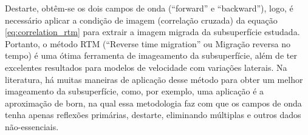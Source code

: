  Destarte, obtêm-se os dois campos de onda (``forward'' e ``backward''), logo, é necessário aplicar a condição de imagem (correlação cruzada) da equação \ref{eq:correlation_rtm} para extrair a imagem migrada da subsuperfície estudada. Portanto, o método RTM (``Reverse time migration'' ou Migração reversa no tempo) é uma ótima ferramenta de imageamento da subsuperfície, além de ter excelentes resultados para modelos de velocidade com variações laterais. Na literatura, há muitas maneiras de aplicação desse método para obter um melhor imageamento da subsuperfície, como, por exemplo, uma aplicação é a aproximação de born, na qual essa metodologia faz com que os campos de onda tenha apenas reflexões primárias, destarte, eliminando múltiplas e outros dados não-essenciais.

